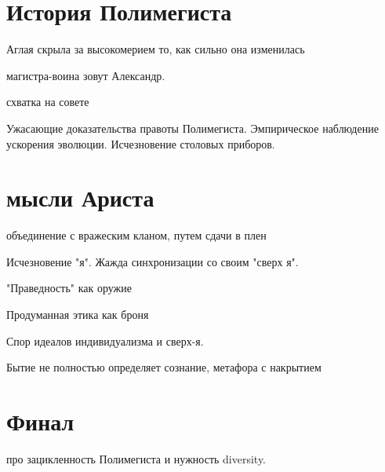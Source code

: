 \documentclass[12pt,a4paper]{article}
\begin{document}
\section*{История Полимегиста}

Аглая скрыла за высокомерием то, как сильно она изменилась

магистра-воина зовут Александр.

схватка на совете

Ужасающие доказательства правоты Полимегиста. Эмпирическое наблюдение ускорения эволюции. Исчезновение столовых приборов. 

\section*{мысли Ариста}

объединение с вражеским кланом, путем сдачи в плен

Исчезновение "я". Жажда синхронизации со своим "сверх я".

"Праведность" как оружие

Продуманная этика как броня

Спор идеалов индивидуализма и сверх-я. 

Бытие не полностью определяет сознание, метафора с накрытием

\section*{Финал}

про зацикленность Полимегиста и нужность diversity.
\end{document}
